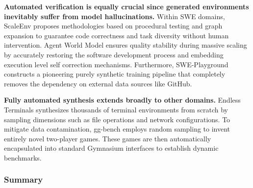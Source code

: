 \documentclass{llmxive}
\begin{document}
\textbf{Automated verification is equally crucial since generated environments inevitably suffer from model hallucinations.} Within SWE domains, ScaleEnv \cite{ScaleEnv} proposes methodologies based on procedural testing and graph expansion to guarantee code correctness and task diversity without human intervention. Agent World Model \cite{Agent_world_model} ensures quality stability during massive scaling by accurately restoring the software development process and embedding execution level self correction mechanisms. Furthermore, SWE-Playground \cite{SWE-Playground} constructs a pioneering purely synthetic training pipeline that completely removes the dependency on external data sources like GitHub. 

\textbf{Fully automated synthesis extends broadly to other domains.} Endless Terminals \cite{Endless_Terminals} synthesizes thousands of terminal environments from scratch by sampling dimensions such as file operations and network configurations. To mitigate data contamination, gg-bench \cite{gg-bench} employs random sampling to invent entirely novel two-player games. These games are then automatically encapsulated into standard Gymnasium interfaces to establish dynamic benchmarks.

\subsubsection{Summary}

\end{document}
